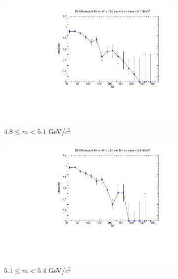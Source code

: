 \begin{figure}[p]
\begin{subfigure}[b]{0.32\textwidth}
        \centering
        \includegraphics[width=\textwidth]{./kTrackerEfficiencyPlots/D2_Efficiency_xF9_mass2.pdf}
        \caption{$4.8 \leq m < 5.1$ GeV/$c^2$}
        \label{fig:xF9_mass2}
    \end{subfigure}
    \vspace{0.5cm}
    \begin{subfigure}[b]{0.32\textwidth}
        \centering
        \includegraphics[width=\textwidth]{./kTrackerEfficiencyPlots/D2_Efficiency_xF9_mass3.pdf}
        \caption{$5.1 \leq m < 5.4$ GeV/$c^2$}
        \label{fig:xF9_mass3}
    \end{subfigure}
    \hfill
    \begin{subfigure}[b]{0.32\textwidth}
        \centering

\end{subfigure}
\end{figure}
